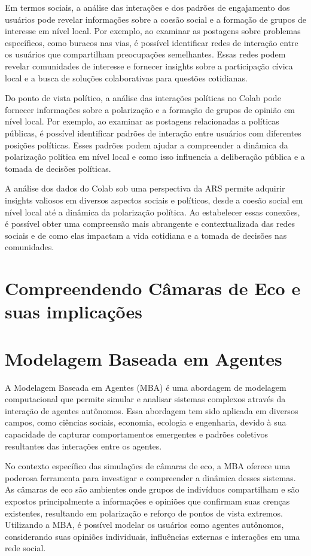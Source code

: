 Em termos sociais, a análise das interações e dos padrões de engajamento dos usuários pode revelar informações sobre a coesão social e a formação de grupos de interesse em nível local. Por exemplo, ao examinar as postagens sobre problemas específicos, como buracos nas vias, é possível identificar redes de interação entre os usuários que compartilham preocupações semelhantes. Essas redes podem revelar comunidades de interesse e fornecer insights sobre a participação cívica local e a busca de soluções colaborativas para questões cotidianas.

Do ponto de vista político, a análise das interações políticas no Colab pode fornecer informações sobre a polarização e a formação de grupos de opinião em nível local. Por exemplo, ao examinar as postagens relacionadas a políticas públicas, é possível identificar padrões de interação entre usuários com diferentes posições políticas. Esses padrões podem ajudar a compreender a dinâmica da polarização política em nível local e como isso influencia a deliberação pública e a tomada de decisões políticas.

A análise dos dados do Colab sob uma perspectiva da ARS permite adquirir insights valiosos em diversos aspectos sociais e políticos, desde a coesão social em nível local até a dinâmica da polarização política. Ao estabelecer essas conexões, é possível obter uma compreensão mais abrangente e contextualizada das redes sociais e de como elas impactam a vida cotidiana e a tomada de decisões nas comunidades.

\section{Compreendendo Câmaras de Eco e suas implicações}
\label{05_echochambers}


\section{Modelagem Baseada em Agentes}
A Modelagem Baseada em Agentes (MBA) é uma abordagem de modelagem computacional que permite simular e analisar sistemas complexos através da interação de agentes autônomos. Essa abordagem tem sido aplicada em diversos campos, como ciências sociais, economia, ecologia e engenharia, devido à sua capacidade de capturar comportamentos emergentes e padrões coletivos resultantes das interações entre os agentes.

No contexto específico das simulações de câmaras de eco, a MBA oferece uma poderosa ferramenta para investigar e compreender a dinâmica desses sistemas. As câmaras de eco são ambientes onde grupos de indivíduos compartilham e são expostos principalmente a informações e opiniões que confirmam suas crenças existentes, resultando em polarização e reforço de pontos de vista extremos. Utilizando a MBA, é possível modelar os usuários como agentes autônomos, considerando suas opiniões individuais, influências externas e interações em uma rede social.

